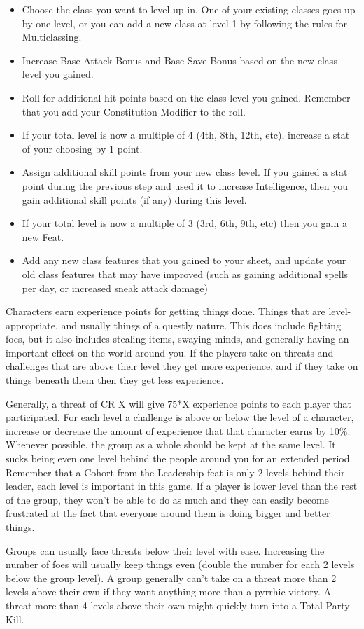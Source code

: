 \begin{itemize}
\item Choose the class you want to level up in. One of your existing classes goes up by one level, or you can add a new class at level 1 by following the rules for Multiclassing.
\item Increase Base Attack Bonus and Base Save Bonus based on the new class level you gained.
\item Roll for additional hit points based on the class level you gained. Remember that you add your Constitution Modifier to the roll.
\item If your total level is now a multiple of 4 (4th, 8th, 12th, etc), increase a stat of your choosing by 1 point.
\item Assign additional skill points from your new class level. If you gained a stat point during the previous step and used it to increase Intelligence, then you gain additional skill points (if any) during this level.
\item If your total level is now a multiple of 3 (3rd, 6th, 9th, etc) then you gain a new Feat.
\item Add any new class features that you gained to your sheet, and update your old class features that may have improved (such as gaining additional spells per day, or increased sneak attack damage)
\end{itemize}

Characters earn experience points for getting things done. Things that are level-appropriate, and usually things of a questly nature. This does include fighting foes, but it also includes stealing items, swaying minds, and generally having an important effect on the world around you. If the players take on threats and challenges that are above their level they get more experience, and if they take on things beneath them then they get less experience. 

Generally, a threat of CR X will give 75*X experience points to each player that participated. For each level a challenge is above or below the level of a character, increase or decrease the amount of experience that that character earns by 10\%. Whenever possible, the group as a whole should be kept at the same level. It sucks being even one level behind the people around you for an extended period. Remember that a Cohort from the Leadership feat is only 2 levels behind their leader, each level is important in this game. If a player is lower level than the rest of the group, they won't be able to do as much and they can easily become frustrated at the fact that everyone around them is doing bigger and better things.

Groups can usually face threats below their level with ease. Increasing the number of foes will usually keep things even (double the number for each 2 levels below the group level). A group generally can't take on a threat more than 2 levels above their own if they want anything more than a pyrrhic victory. A threat more than 4 levels above their own might quickly turn into a Total Party Kill.